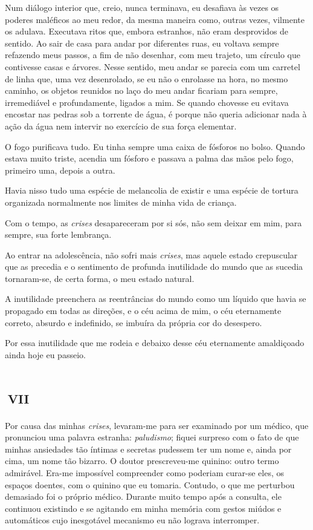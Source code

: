 Num diálogo interior que, creio, nunca terminava, eu desafiava às vezes os poderes maléficos ao meu redor, da mesma maneira como, outras vezes, vilmente os adulava. Executava ritos que, embora estranhos, não eram desprovidos de sentido. Ao sair de casa para andar por diferentes ruas, eu voltava sempre refazendo meus passos, a fim de não desenhar, com meu trajeto, um círculo que contivesse casas e árvores. Nesse sentido, meu andar se parecia com um carretel de linha que, uma vez desenrolado, se eu não o enrolasse na hora, no mesmo caminho, os objetos reunidos no laço do meu andar ficariam para sempre, irremediável e profundamente, ligados a mim. Se quando chovesse eu evitava encostar nas pedras sob a torrente de água, é porque não queria adicionar nada à ação da água nem intervir no exercício de sua força elementar.

O fogo purificava tudo. Eu tinha sempre uma caixa de fósforos no bolso. Quando estava muito triste, acendia um fósforo e passava a palma das mãos pelo fogo, primeiro uma, depois a outra.

Havia nisso tudo uma espécie de melancolia de existir e uma espécie de tortura organizada normalmente nos limites de minha vida de criança.

Com o tempo, as \textit{crises} desapareceram por si sós, não sem deixar em mim, para sempre, sua forte lembrança.

Ao entrar na adolescência, não sofri mais \textit{crises}, mas aquele estado crepuscular que as precedia e o sentimento de profunda inutilidade do mundo que as sucedia tornaram-se, de certa forma, o meu estado natural.

A inutilidade preenchera as reentrâncias do mundo como um líquido que havia se propagado em todas as direções, e o céu acima de mim, o céu eternamente correto, absurdo e indefinido, se imbuíra da própria cor do desespero. 

Por essa inutilidade que me rodeia e debaixo desse céu eternamente amaldiçoado ainda hoje eu passeio.


\chapter*{\small{}\,\Large\centering\textsc{vii}\,\small{}}

Por causa das minhas \textit{crises}, levaram-me para ser examinado por um médico, que pronunciou uma palavra estranha: \textit{paludismo}; fiquei surpreso com o fato de que minhas ansiedades tão íntimas e secretas pudessem ter um nome e, ainda por cima, um nome tão bizarro. O doutor prescreveu-me quinino: outro termo admirável. Era-me impossível compreender como poderiam curar-se eles, os espaços doentes, com o quinino que eu tomaria. Contudo, o que me perturbou demasiado foi o próprio médico. Durante muito tempo após a consulta, ele continuou existindo e se agitando em minha memória com gestos miúdos e automáticos cujo inesgotável mecanismo eu não lograva interromper.


